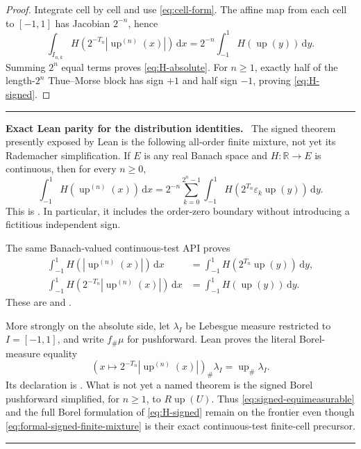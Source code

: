 \documentclass[11pt,oneside]{article}
\numberwithin{equation}{section}
\theoremstyle{plain}
\theoremstyle{definition}
\theoremstyle{remark}
\newcommand{\R}{\mathbb R}
\newcommand{\Up}{\operatorname{up}}
\newcommand{\dd}{\,\mathrm d}
\newcommand{\abs}[1]{\left|#1\right|}
\newenvironment{statusbox}[1]{%
  \par\medskip\noindent\begin{minipage}{\textwidth}%
  \color{DeepBlue}\hrule\vspace{5pt}%
  \color{black}\textbf{\color{DeepBlue}#1.}\ }{%
  \par\vspace{5pt}\color{DeepBlue}\hrule
  \end{minipage}\par\medskip}
\begin{document}
\begin{proof}
Integrate cell by cell and use \eqref{eq:cell-form}.  The affine map from each cell to
$[-1,1]$ has Jacobian $2^{-n}$, hence
\[
 \int_{I_{n,k}}H\!\left(2^{-T_n}\abs{\Up^{(n)}(x)}\right)\dd x
 =2^{-n}\int_{-1}^{1}H(\Up(y))\dd y.
\]
Summing $2^n$ equal terms proves \eqref{eq:H-absolute}.  For $n\geq1$, exactly half of the
length-$2^n$ Thue--Morse block has sign $+1$ and half sign $-1$, proving
\eqref{eq:H-signed}.
\end{proof}

\begin{statusbox}{Exact Lean parity for the distribution identities}
The signed theorem presently exposed by Lean is the following all-order finite mixture,
not yet its Rademacher simplification.  If \(E\) is any real Banach space and
\(H:\R\to E\) is continuous, then for every \(n\ge0\),
\begin{equation}
 \int_{-1}^{1}H\!\left(\Up^{(n)}(x)\right)\dd x
 =
 2^{-n}\sum_{k=0}^{2^n-1}
 \int_{-1}^{1}H\!\left(2^{T_n}\varepsilon_k\Up(y)\right)\dd y.
 \label{eq:formal-signed-finite-mixture}
\end{equation}
This is .  In particular, it includes the
order-zero boundary without introducing a fictitious independent sign.

The same Banach-valued continuous-test API proves
\begin{align}
 \int_{-1}^{1}H\!\left(\abs{\Up^{(n)}(x)}\right)\dd x
 &=
 \int_{-1}^{1}H\!\left(2^{T_n}\Up(y)\right)\dd y,
 \label{eq:formal-absolute-test}\\
 \int_{-1}^{1}H\!\left(2^{-T_n}\abs{\Up^{(n)}(x)}\right)\dd x
 &=
 \int_{-1}^{1}H(\Up(y))\dd y.
 \label{eq:formal-normalized-absolute-test}
\end{align}
These are  and
.

More strongly on the absolute side, let
\(\lambda_I\) be Lebesgue measure restricted to \(I=[-1,1]\), and write
\(f_{\#}\mu\) for pushforward.  Lean proves the literal Borel-measure equality
\begin{equation}
 \left(x\longmapsto2^{-T_n}\abs{\Up^{(n)}(x)}\right)_{\#}\lambda_I
 =\Up_{\#}\lambda_I.                                      \label{eq:formal-absolute-pushforward}
\end{equation}
Its declaration is
.  What is not yet a named
theorem is the signed Borel pushforward simplified, for \(n\ge1\), to
\(R\Up(U)\).  Thus \eqref{eq:signed-equimeasurable} and the full Borel formulation of
\eqref{eq:H-signed} remain on the frontier even though
\eqref{eq:formal-signed-finite-mixture} is their exact continuous-test finite-cell
precursor.
\end{statusbox}
\end{document}
